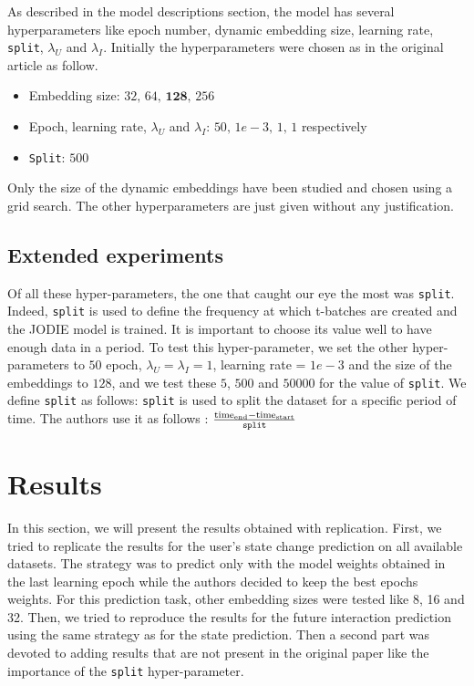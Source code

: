
As described in the model descriptions section, the model has several hyperparameters like epoch number, dynamic embedding size, learning rate, \texttt{split}, $\lambda_U$ and $\lambda_I$. Initially the hyperparameters were chosen as in the original article as follow.

\begin{itemize}
    \item Embedding size: $32, \, 64, \, \textbf{128}, \, 256$
    \item Epoch, learning rate, $\lambda_U$ and $\lambda_I$: $50, \, 1e-3, \, 1, \, 1$ respectively
    \item \texttt{Split}: $500$
\end{itemize}

Only the size of the dynamic embeddings have been studied and chosen using a grid search. The other hyperparameters are just given without any justification.

\subsection*{Extended experiments}


Of all these hyper-parameters, the one that caught our eye the most was \texttt{split}. Indeed, \texttt{split} is used to define the frequency at which t-batches are created and the JODIE model is trained. It is important to choose its value well to have enough data in a period. To test this hyper-parameter, we set the other hyper-parameters to $50$ epoch, $\lambda_U = \lambda_I = 1$, learning rate = $1e-3$ and the size of the embeddings to $128$, and we test these $5$, $500$ and $50000$ for the value of \texttt{split}. We define \texttt{split} as follows:
\texttt{split} is used to split the dataset for a specific period of time. The authors use it as follows : $\frac{\text{time}_{\text{end}} - \text{time}_{\text{start}}}{\text{\texttt{split}}}$

\section*{Results}

In this section, we will present the results obtained with replication. First, we tried to replicate the results for the user's state change prediction on all available datasets. The strategy  was to predict only with the model weights obtained in the last learning epoch while the authors decided to keep the best epochs weights. For this prediction task, other embedding sizes were tested like 8, 16 and 32. Then, we tried to reproduce the results for the future interaction prediction using the same strategy as for the state prediction. Then a second part was devoted to adding results that are not present in the original paper like the importance of the \texttt{split} hyper-parameter.

